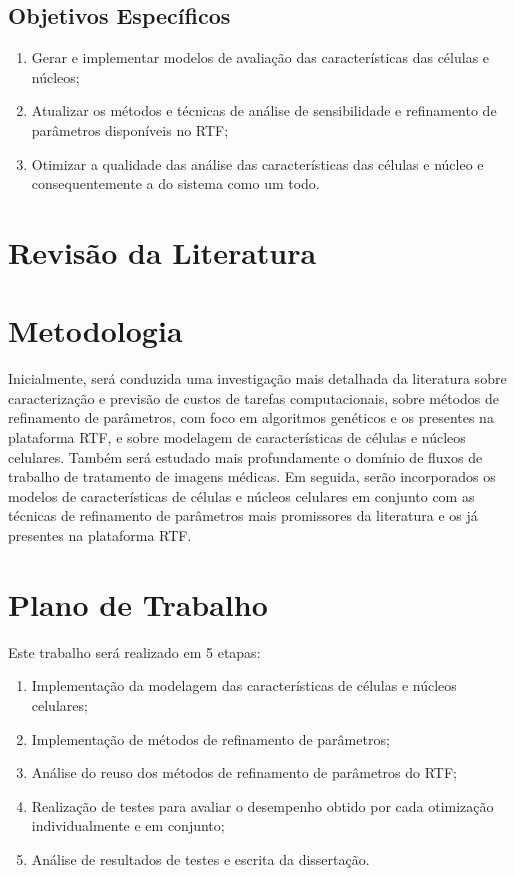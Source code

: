 \documentclass[a4paper,10pt]{article}
\begin{document}
\subsection{Objetivos Específicos}

\begin{enumerate}
	\item  Gerar e implementar modelos de avaliação das características das células e núcleos;
\item  Atualizar os métodos e técnicas de análise de sensibilidade e refinamento de parâmetros disponíveis no RTF;
\item Otimizar a qualidade das análise das características das células e núcleo e consequentemente a do sistema como um todo.
\end{enumerate}


\section{Revisão da Literatura}

\section{Metodologia}
Inicialmente, será conduzida uma investigação mais detalhada da literatura sobre caracterização e previsão de custos de tarefas computacionais, sobre métodos de refinamento de parâmetros, com foco em algoritmos genéticos e os presentes na plataforma RTF, e sobre modelagem de características de células e núcleos celulares. Também será estudado mais profundamente o domínio de fluxos de trabalho de tratamento de imagens médicas. Em seguida, serão incorporados os modelos de características de células e núcleos celulares em conjunto com as técnicas de refinamento de parâmetros mais promissores da literatura e os já presentes na plataforma RTF.

\section{Plano de Trabalho}

Este trabalho será realizado em 5 etapas:
\begin{enumerate}
	\item Implementação da modelagem das características de células e núcleos celulares;
	\item Implementação de métodos de refinamento de parâmetros;
	\item Análise do reuso dos métodos de refinamento de parâmetros do RTF;
	\item Realização de testes para avaliar o desempenho obtido por cada otimização individualmente e em conjunto;
	\item Análise de resultados de testes e escrita da dissertação.
\end{enumerate}
\end{document}
